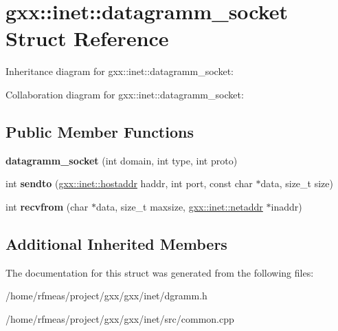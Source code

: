 \hypertarget{structgxx_1_1inet_1_1datagramm__socket}{}\section{gxx\+:\+:inet\+:\+:datagramm\+\_\+socket Struct Reference}
\label{structgxx_1_1inet_1_1datagramm__socket}


Inheritance diagram for gxx\+:\+:inet\+:\+:datagramm\+\_\+socket\+:


Collaboration diagram for gxx\+:\+:inet\+:\+:datagramm\+\_\+socket\+:
\subsection*{Public Member Functions}
\begin{DoxyCompactItemize}
\item 
{\bfseries datagramm\+\_\+socket} (int domain, int type, int proto)\hypertarget{structgxx_1_1inet_1_1datagramm__socket_a9439e5f734cec85e17b1b2f4bf1db4d1}{}\label{structgxx_1_1inet_1_1datagramm__socket_a9439e5f734cec85e17b1b2f4bf1db4d1}

\item 
int {\bfseries sendto} (\hyperlink{classgxx_1_1hostaddr}{gxx\+::inet\+::hostaddr} haddr, int port, const char $\ast$data, size\+\_\+t size)\hypertarget{structgxx_1_1inet_1_1datagramm__socket_a28e77b93fd7040079e4cb9353ad263b3}{}\label{structgxx_1_1inet_1_1datagramm__socket_a28e77b93fd7040079e4cb9353ad263b3}

\item 
int {\bfseries recvfrom} (char $\ast$data, size\+\_\+t maxsize, \hyperlink{structgxx_1_1inet_1_1netaddr}{gxx\+::inet\+::netaddr} $\ast$inaddr)\hypertarget{structgxx_1_1inet_1_1datagramm__socket_a8459652652779265adac1180afb12749}{}\label{structgxx_1_1inet_1_1datagramm__socket_a8459652652779265adac1180afb12749}

\end{DoxyCompactItemize}
\subsection*{Additional Inherited Members}


The documentation for this struct was generated from the following files\+:\begin{DoxyCompactItemize}
\item 
/home/rfmeas/project/gxx/gxx/inet/dgramm.\+h\item 
/home/rfmeas/project/gxx/gxx/inet/src/common.\+cpp\end{DoxyCompactItemize}
